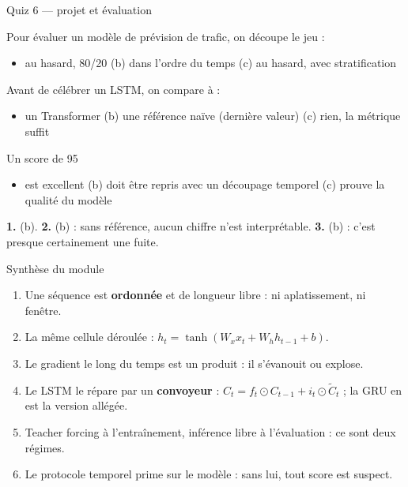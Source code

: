 \begin{frame}{Quiz 6 --- projet et évaluation}
\begin{qbox}[Question 1]
Pour évaluer un modèle de prévision de trafic, on découpe le jeu :
\begin{itemize}
  \item[(a)] au hasard, 80/20 \quad (b) dans l'ordre du temps
  \quad (c) au hasard, avec stratification
\end{itemize}
\end{qbox}
\begin{qbox}[Question 2]
Avant de célébrer un LSTM, on compare à :
\begin{itemize}
  \item[(a)] un Transformer \quad (b) une référence naïve (dernière valeur)
  \quad (c) rien, la métrique suffit
\end{itemize}
\end{qbox}
\begin{qbox}[Question 3]
Un score de 95 %
\begin{itemize}
  \item[(a)] est excellent \quad (b) doit être repris avec un découpage temporel
  \quad (c) prouve la qualité du modèle
\end{itemize}
\end{qbox}
\begin{solbox}[Réponses]
\textbf{1.} (b). \quad \textbf{2.} (b) : sans référence, aucun chiffre n'est
interprétable. \quad \textbf{3.} (b) : c'est presque certainement une fuite.
\end{solbox}
\end{frame}

\begin{frame}{Synthèse du module}
\begin{kbox}
\begin{enumerate}
  \item Une séquence est \textbf{ordonnée} et de longueur libre : ni aplatissement,
  ni fenêtre.
  \item La même cellule déroulée : $h_t = \tanh(W_x x_t + W_h h_{t-1} + b)$.
  \item Le gradient le long du temps est un produit : il s'évanouit ou explose.
  \item Le LSTM le répare par un \textbf{convoyeur} : $C_t = f_t \odot C_{t-1}
  + i_t \odot \tilde{C}_t$ ; la GRU en est la version allégée.
  \item Teacher forcing à l'entraînement, inférence libre à l'évaluation :
  ce sont deux régimes.
  \item Le protocole temporel prime sur le modèle : sans lui, tout score est
  suspect.
\end{enumerate}
\end{kbox}
\end{frame}

